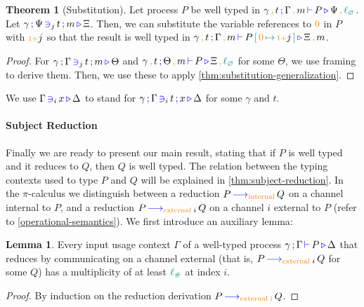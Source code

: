 \documentclass[sigplan,10pt,anonymous,review]{acmart}
\theoremstyle{definition}
\newtheorem{nitheorem}{Theorem}
\newtheorem{nilemma}{Lemma}
\newcommand{\picalc}{$\pi$-calculus}
\newcommand{\type}[1]{\textcolor{blue}{\operatorname{#1}}}
\newcommand{\constr}[1]{\textcolor{orange}{\operatorname{#1}}}
\newcommand{\func}[1]{\textcolor{teal}{\operatorname{#1}}}
\newcommand{\suc}{\constr{\scriptstyle 1+}}
\newcommand{\comma}{\, \constr{,} \,}
\newcommand{\subst}[3]{#1 \, \func{[} \, #3 \, \func{\mapsto} \,#2 \, \func{]}}
\newcommand{\lz}{\func{\ell_{\varnothing}}}
\newcommand{\lio}{\func{\ell_{\#}}}
\newcommand{\reduce}[1]{\, \type{\longrightarrow}_{#1} \,}
\newcommand{\types}[4]{#1 \, \type{;} \, #2 \, \type{\vdash} \, #3 \, \type{\triangleright} \, #4}
\newcommand{\contains}[6]{#1 \, \type{;} \, #2 \, \type{\ni}_{#3} \, #4 \, \type{;} \, #5 \, \type{\triangleright} \, #6}
\newcommand{\containsusage}[4]{#1 \, \type{\ni}_{#2} \, #3 \, \type{\triangleright} \, #4}
\begin{document}
\begin{nitheorem}[Substitution]
  \label{thm:substitution}
  Let process $P$ be well typed in $\types{\gamma \comma t}{\Gamma \comma m}{P}{\Psi \comma \lz}$.
  Let $\contains{\gamma}{\Psi}{j}{t}{m}{\Xi}$.
  Then, we can substitute the variable references to $\constr{0}$ in $P$ with $\suc j$ so that the result is well typed in $\types{\gamma \comma t}{\Gamma \comma m}{\subst{P}{\suc j}{\constr{0}}}{\Xi \comma m}$.
\end{nitheorem}
\begin{proof}[Proof]
  For $\contains{\gamma}{\Gamma}{j}{t}{m}{\Theta}$ and $\types{\gamma \comma t}{\Theta \comma m}{P}{\Xi \comma \lz}$ for some $\Theta$, we use framing to derive them.
  Then, we use these to apply \autoref{thm:substitution-generalization}.
\end{proof}


  We use $\containsusage{\Gamma}{i}{x}{\Delta}$ to stand for $\contains{\gamma}{\Gamma}{i}{t}{x}{\Delta}$ for some $\gamma$ and $t$.

\paragraph*{Subject Reduction}
Finally we are ready to present our main result, stating  that if $P$ is well typed and it reduces to $Q$, then $Q$ is well typed.
The relation between the typing contexts used to type $P$ and $Q$ will be explained in \autoref{thm:subject-reduction}.
In the \picalc{} we distinguish between a reduction $P \reduce{\constr{internal}} Q$ on a channel internal to $P$, and a reduction $P \reduce{\constr{external} \; i} Q$ on a channel $i$ external to $P$ (refer to \autoref{operational-semantics}).
We first introduce an auxiliary lemma:

\begin{nilemma}
  \label{lm:comm-capable}
  Every input usage context $\Gamma$ of a well-typed process $\types{\gamma}{\Gamma}{P}{\Delta}$ that reduces by communicating on a channel external (that is, $P \reduce{\constr{external} \; i} Q$ for some $Q$) has a multiplicity of at least $\lio$ at index $i$.
\end{nilemma}

\begin{proof}
  By induction on the reduction derivation $P \reduce{\constr{external \; i}}Q$.
\end{proof}
\end{document}
